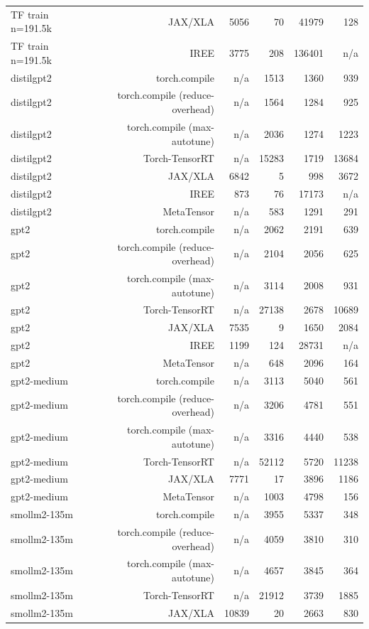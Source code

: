 \begin{tabular}{lrrrrr}
TF train n=191.5k & JAX/XLA & 5056 & 70 & 41979 & 128 \\
TF train n=191.5k & IREE & 3775 & 208 & 136401 & n/a \\
distilgpt2 & torch.compile & n/a & 1513 & 1360 & 939 \\
distilgpt2 & torch.compile (reduce-overhead) & n/a & 1564 & 1284 & 925 \\
distilgpt2 & torch.compile (max-autotune) & n/a & 2036 & 1274 & 1223 \\
distilgpt2 & Torch-TensorRT & n/a & 15283 & 1719 & 13684 \\
distilgpt2 & JAX/XLA & 6842 & 5 & 998 & 3672 \\
distilgpt2 & IREE & 873 & 76 & 17173 & n/a \\
distilgpt2 & MetaTensor & n/a & 583 & 1291 & 291 \\
gpt2 & torch.compile & n/a & 2062 & 2191 & 639 \\
gpt2 & torch.compile (reduce-overhead) & n/a & 2104 & 2056 & 625 \\
gpt2 & torch.compile (max-autotune) & n/a & 3114 & 2008 & 931 \\
gpt2 & Torch-TensorRT & n/a & 27138 & 2678 & 10689 \\
gpt2 & JAX/XLA & 7535 & 9 & 1650 & 2084 \\
gpt2 & IREE & 1199 & 124 & 28731 & n/a \\
gpt2 & MetaTensor & n/a & 648 & 2096 & 164 \\
gpt2-medium & torch.compile & n/a & 3113 & 5040 & 561 \\
gpt2-medium & torch.compile (reduce-overhead) & n/a & 3206 & 4781 & 551 \\
gpt2-medium & torch.compile (max-autotune) & n/a & 3316 & 4440 & 538 \\
gpt2-medium & Torch-TensorRT & n/a & 52112 & 5720 & 11238 \\
gpt2-medium & JAX/XLA & 7771 & 17 & 3896 & 1186 \\
gpt2-medium & MetaTensor & n/a & 1003 & 4798 & 156 \\
smollm2-135m & torch.compile & n/a & 3955 & 5337 & 348 \\
smollm2-135m & torch.compile (reduce-overhead) & n/a & 4059 & 3810 & 310 \\
smollm2-135m & torch.compile (max-autotune) & n/a & 4657 & 3845 & 364 \\
smollm2-135m & Torch-TensorRT & n/a & 21912 & 3739 & 1885 \\
smollm2-135m & JAX/XLA & 10839 & 20 & 2663 & 830 \\

\end{tabular}
